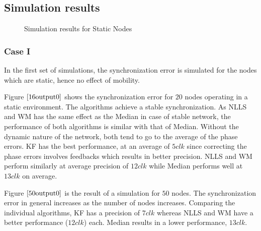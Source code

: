 \documentclass[journal]{IEEEtran}
\begin{document}
\subsection{\textbf{Simulation results}}
\begin{figure}
\centerline{
\hfil
{}}
\caption{Simulation results for Static Nodes }
\label{static}
\end{figure}
\subsubsection{\textbf{Case I}} In the first set of simulations, the synchronization error is simulated for the nodes which are static, hence no effect of mobility.
\par
Figure $\ref{16output0}$ shows the synchronization error for $20$
nodes operating in a static environment. The algorithms achieve a
stable synchronization. As NLLS and WM has the same effect as the
Median in case of stable network, the performance of both algorithms
is similar with that of Median. Without the dynamic nature of the
network, both tend to go to the average of the phase errors. KF has
the best performance, at an average of $5clk$ since correcting the
phase errors involves feedbacks which results in better precision.
NLLS and WM perform similarly at average precision of $12clk$ while
Median performs well at $13clk$ on average.
\par
Figure $\ref{50output0}$ is the result of a simulation for $50$
nodes. The synchronization error in general increases as the number
of nodes increases. Comparing the individual algorithms, KF has a
precision of $7clk$ whereas NLLS and WM have a better performance
($12clk$) each. Median results in a lower performance, $13clk$.
\end{document}
